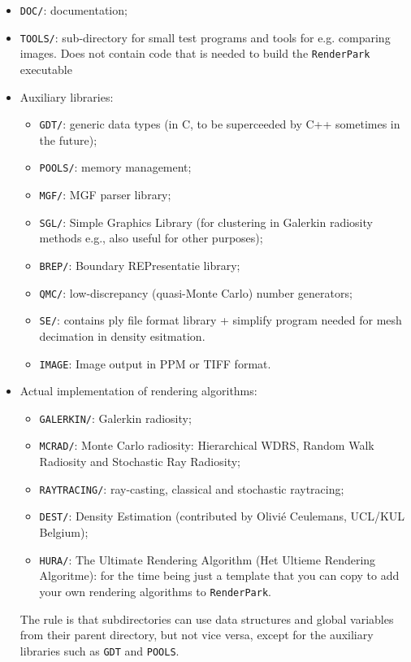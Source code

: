 \documentclass[11pt]{report}
\begin{document}
\begin{itemize}
\item {\tt DOC/}: documentation;
\item {\tt TOOLS/}: sub-directory for small test programs and tools for 
  e\@.g\@. comparing images. Does not contain code that is needed to
  build the {\tt RenderPark} executable
\item Auxiliary libraries:
  \begin{itemize}
\item {\tt GDT/}: generic data types (in C, to be superceeded by C++ sometimes 
  in the future);
\item {\tt POOLS/}: memory management;
\item {\tt MGF/}: MGF parser library;
\item {\tt SGL/}: Simple Graphics Library (for clustering in Galerkin radiosity methods e\@.g\@., also useful for other purposes);
\item {\tt BREP/}: Boundary REPresentatie library;
\item {\tt QMC/}: low-discrepancy (quasi-Monte Carlo) number generators;
\item {\tt SE/}: contains ply file format library + simplify program needed
	for mesh decimation in density esitmation.
\item {\tt IMAGE}: Image output in PPM or TIFF format.
\end{itemize}
\item Actual implementation of rendering algorithms:
  \begin{itemize}
  \item {\tt GALERKIN/}: Galerkin radiosity;
  \item {\tt MCRAD/}: Monte Carlo radiosity: Hierarchical WDRS, Random
	Walk Radiosity and Stochastic Ray Radiosity;
  \item {\tt RAYTRACING/}: ray-casting, classical and stochastic raytracing;
  \item {\tt DEST/}: Density Estimation (contributed by Olivi\'e Ceulemans,
	UCL/KUL Belgium);
  \item {\tt HURA/}: The Ultimate Rendering Algorithm (Het Ultieme Rendering Algoritme): 
    for the time being just a template that you can copy to add your own
    rendering algorithms to {\tt RenderPark}.
  \end{itemize}
  The rule is that subdirectories can use data structures and global variables
  from their parent directory, but not vice versa, except
  for the auxiliary libraries such as {\tt GDT} and {\tt POOLS}.
\end{itemize}
\end{document}
